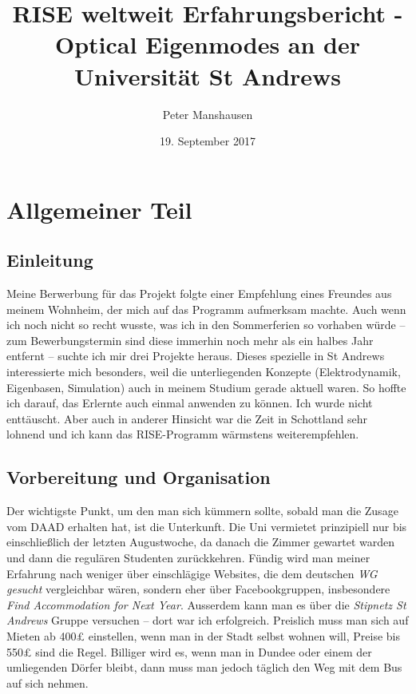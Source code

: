 \documentclass{article}
\begin{document}
\title{RISE weltweit Erfahrungsbericht - Optical Eigenmodes an der Universit{\"a}t St Andrews}
\author{ Peter Manshausen}
\date{19. September 2017}
\maketitle
\pagebreak
\renewcommand\contentsname{Inhalt}
\tableofcontents
\section{Allgemeiner Teil}
\subsection{Einleitung}
Meine Berwerbung f\"{u}r das Projekt folgte einer Empfehlung eines Freundes aus meinem Wohnheim, der mich auf das Programm aufmerksam machte. Auch wenn ich noch nicht so recht wusste, was ich in den Sommerferien so vorhaben w\"{u}rde -- zum Bewerbungstermin sind diese immerhin noch mehr als ein halbes Jahr entfernt -- suchte ich mir drei Projekte heraus. Dieses spezielle in St Andrews interessierte mich besonders, weil die unterliegenden Konzepte (Elektrodynamik, Eigenbasen, Simulation) auch in meinem Studium gerade aktuell waren. So hoffte ich darauf, das Erlernte auch einmal anwenden zu k\"{o}nnen. Ich wurde nicht entt\"{a}uscht. Aber auch in anderer Hinsicht war die Zeit in Schottland sehr lohnend und ich kann das RISE-Programm w\"{a}rmstens weiterempfehlen.
\subsection{Vorbereitung und Organisation}
Der wichtigste Punkt, um den man sich k{\"u}mmern sollte, sobald man die Zusage vom DAAD erhalten hat, ist die Unterkunft. Die Uni vermietet prinzipiell nur bis einschlie{\ss}lich der letzten Augustwoche, da danach die Zimmer gewartet warden und dann die regul{\"a}ren Studenten zur{\"u}ckkehren. F\"{u}ndig wird man meiner Erfahrung nach weniger \"{u}ber einschl{\"a}gige Websites, die dem deutschen \emph{WG gesucht} vergleichbar w{\"a}ren, sondern eher \"{u}ber Facebookgruppen, insbesondere \emph{Find Accommodation for Next Year}. Ausserdem kann man es \"{u}ber die \emph{Stipnetz St Andrews} Gruppe versuchen – dort war ich erfolgreich. Preislich muss man sich auf Mieten ab 400{\pounds} einstellen, wenn man in der Stadt selbst wohnen will, Preise bis 550{\pounds} sind die Regel. Billiger wird es, wenn man in Dundee oder einem der umliegenden D{\"o}rfer bleibt, dann muss man jedoch t{\"a}glich den Weg mit dem Bus auf sich nehmen.  
\end{document}
